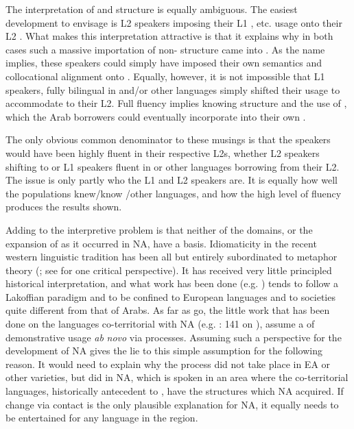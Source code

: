 \documentclass[output=paper]{langsci/langscibook}
\begin{document}
The interpretation of  and  structure is equally ambiguous. The easiest development to envisage is L2  speakers imposing their L1 ,  etc. usage onto their L2 . What makes this interpretation attractive is that it explains why in both cases such a massive importation of non- structure came into . As the name implies, these speakers could simply have imposed their own semantics and collocational alignment onto . Equally, however, it is not impossible that L1  speakers, fully bilingual in  and/or other languages simply shifted their  usage to accommodate to their L2. Full fluency implies knowing  structure and the use of , which the Arab borrowers could eventually incorporate into their own .

The only obvious common denominator to these musings is that the speakers would have been highly fluent in their respective L2s, whether L2  speakers shifting to  or L1  speakers fluent in  or other languages borrowing from their L2. The issue is only partly who the L1 and L2 speakers are. It is equally how well the populations knew/know /other languages, and how the high level of fluency produces the results shown.

Adding to the interpretive problem is that neither of the domains,  or the expansion of  as it occurred in NA, have a  basis. Idiomaticity in the recent western linguistic tradition has been all but entirely subordinated to metaphor theory (\citealt{LakoffJohnson1999}; see \citealt{Haser2005} for one critical perspective). It has received very little principled historical interpretation, and what work has been done (e.g. \citealt{Sweetser1990}) tends to follow a Lakoffian paradigm and to be confined to European languages and to societies quite different from that of  Arabs. As far as  go, the little work that has been done on the languages co-territorial with NA (e.g. \citealt{Kramer2014}: 141 on ), assume a  of demonstrative usage \textit{ab} \textit{novo} via  processes. Assuming such a perspective for the development of NA gives the lie to this simple assumption for the following reason. It would need to explain why the  process did not take place in EA or other  varieties, but did in NA, which is spoken in an area where the co-territorial languages, historically antecedent to , have the structures which NA acquired. If change via contact is the only plausible explanation for NA, it equally needs to be entertained for any language in the  region.
\end{document}
